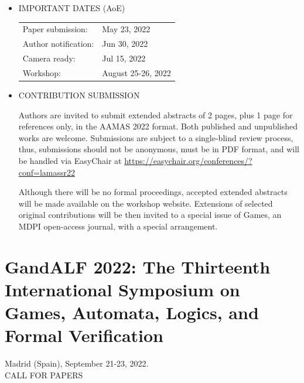 \documentclass[prodmode,acmtecs]{acmsmall} %
\begin{document}
\begin{itemize}
\item  IMPORTANT DATES (AoE)  
 
\begin{tabulary}{\linewidth}{LL}Paper submission:  & May 23, 2022 \\
Author notification:  & Jun 30, 2022 \\
Camera ready:  & Jul 15, 2022 \\
Workshop:  & August 25-26, 2022 \\
\end{tabulary}
 
\item  CONTRIBUTION SUBMISSION  
 
  Authors are invited to submit extended abstracts of 2 pages, plus 1 page for references only, in the AAMAS 2022 format. Both published and unpublished works are welcome. Submissions are subject to a single-blind review process, thus, submissions should not be anonymous, must be in PDF format, and will be handled via EasyChair at \href{https://easychair.org/conferences/?conf=lamassr22}{https://easychair.org/conferences/?conf=lamassr22} 
 
  Although there will be no formal proceedings, accepted extended abstracts will be made available on the workshop website. Extensions of selected original contributions will be then invited to a special issue of Games, an MDPI open-access journal, with a special arrangement. 
 
\end{itemize}\section{GandALF 2022: The Thirteenth International Symposium on Games, Automata, Logics, and Formal Verification }\label{GandALF2022}  Madrid (Spain), September 21-23, 2022.\\ 
CALL FOR PAPERS 
\end{document}
